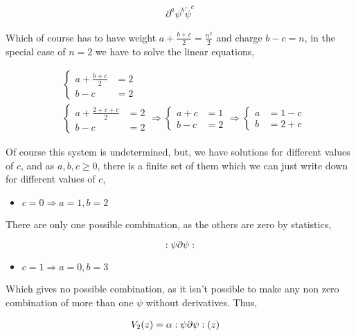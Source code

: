 \begin{align*}
    \partial^a\psi^b{\tilde\psi}^c
\end{align*}

Which of course has to have weight $a+\frac{b+c}{2}=\frac{n^2}{2}$ and charge $b-c=n$, in the special case of $n=2$ we have 
to solve the linear equations,

\begin{align*}
    &\begin{cases}
        a+\frac{b+c}{2}&=2\\
        b-c&=2
    \end{cases}\\
    &\begin{cases}
        a+\frac{2+c+c}{2}&=2\\
        b-c&=2
    \end{cases}\Rightarrow
    \begin{cases}
        a+c&=1\\
        b-c&=2
    \end{cases}\Rightarrow
    \begin{cases}
        a&=1-c\\
        b&=2+c
    \end{cases}
\end{align*}

Of course this system is undetermined, but, we have solutions for different values of $c$, and as $a,b,c\geq0$, there is a finite set of them which we can just 
write down for different values of $c$,

\begin{itemize}
    \item $c=0\Rightarrow a=1,b=2$
\end{itemize}

There are only one possible combination, as the others are zero by statistics,

$$:\psi\partial\psi:$$

\begin{itemize}
    \item $c=1\Rightarrow a=0,b=3$
\end{itemize}

Which gives no possible combination, as it isn't possible to make any non zero combination of more than one $\psi$ 
without derivatives. Thus,

\begin{align*}
    V_2\qty(z)&=\alpha:\psi\partial\psi:\qty(z)
\end{align*}

